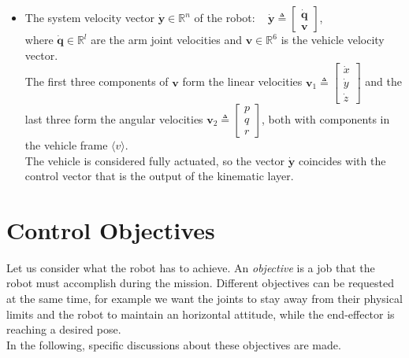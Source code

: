 \begin{itemize}
	\item The system velocity vector $\dot{\boldsymbol{y}} \in \mathbb{R}^n$ of the robot: ~
	$\dot{\boldsymbol{y}} \triangleq 
	\begin{bmatrix}\dot{\boldsymbol{q}} \\ \boldsymbol{v}\end{bmatrix}$,\\
	where $\dot{\boldsymbol{q}} \in \mathbb{R}^{l}$ are the arm joint velocities and $\boldsymbol{v} \in \mathbb{R}^{6}$ is the vehicle velocity vector.\\
	The first three components of $\boldsymbol{v}$ form the linear velocities $\boldsymbol{v}_1 \triangleq \begin{bmatrix}\dot{x} \\ \dot{y} \\ \dot{z}\end{bmatrix}$ and the last three form the angular velocities $\boldsymbol{v}_2 \triangleq \begin{bmatrix}p \\ q \\ r\end{bmatrix}$, both with components in the vehicle frame $\langle v \rangle$. \\
	The vehicle is considered fully actuated, so the vector $\dot{\boldsymbol{y}}$ coincides with the control vector that is the output of the kinematic layer.
\end{itemize}
	
\section{Control Objectives}
\label{sec:controlObjectives}
Let us consider what the robot has to achieve. An \textit{objective} is a job that the robot must accomplish during the mission. Different objectives can be requested at the same time, for example we want the joints to stay away from their physical limits and the robot to maintain an horizontal attitude, while the end-effector is reaching a desired pose. \\
In the following, specific discussions about these objectives are made.
